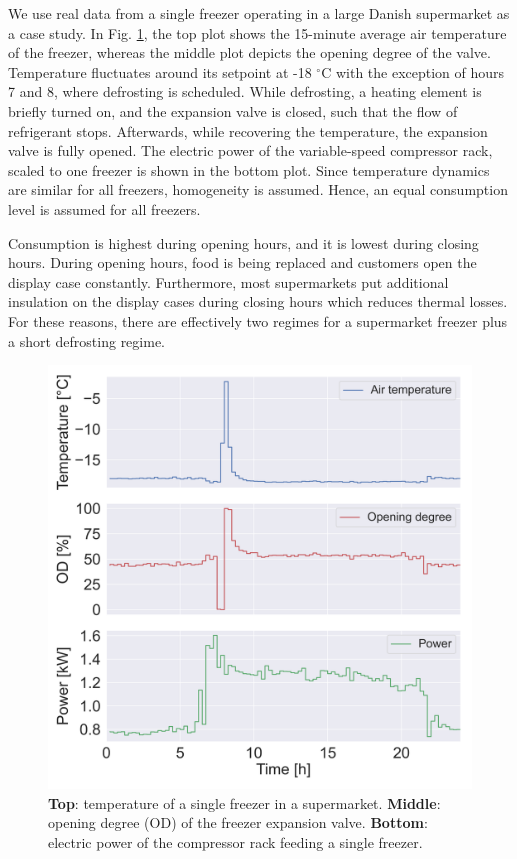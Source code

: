 \documentclass[11pt,a4paper]{article}
\begin{document}
We use real data from a single freezer operating in a large Danish supermarket as a case study.
In Fig. \ref{fig:chunk}, the top plot shows the 15-minute average air temperature of the freezer, whereas the middle plot depicts the opening degree of the valve.
%
Temperature fluctuates around its setpoint at -18 $^{\circ}$C with the exception of hours 7 and 8, where defrosting is scheduled.
While defrosting, a heating element is briefly turned on, and the expansion valve is closed, such that the flow of refrigerant stops. Afterwards, while recovering the temperature, the expansion valve is fully opened.
The electric power of the variable-speed compressor rack, scaled to one freezer is shown in the bottom plot. Since temperature dynamics are similar for all freezers, homogeneity is assumed. Hence, an equal consumption level is assumed for all freezers.

Consumption is highest during opening hours, and it is lowest during closing hours.
During opening hours, food is being replaced and customers open the display case constantly.
Furthermore, most supermarkets put additional insulation on the display cases during closing hours which reduces thermal losses.
For these reasons, there are effectively two regimes for a supermarket freezer plus a short defrosting regime.

\begin{figure}[!t]
    \centering
    \includegraphics[width=\columnwidth]{figures/tmp_od_Pt.png}
    \caption{\textbf{Top}: temperature of a single freezer in a supermarket. \textbf{Middle}: opening degree (OD) of the freezer expansion valve. \textbf{Bottom}: electric power of the compressor rack feeding a single freezer.}
    \label{fig:chunk}
\end{figure}
\end{document}
